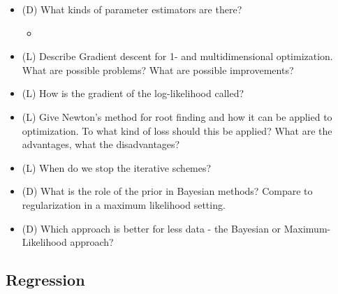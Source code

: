 \begin{itemize}
    \item (D) What kinds of parameter estimators are there?
    \begin{itemize}
        \item {}
    \end{itemize}
    \answerboxM
    \item (L) Describe Gradient descent for 1- and multidimensional optimization. What are possible problems? What are possible improvements?
    \answerboxL
    \item (L) How is the gradient of the log-likelihood called?
    \answerboxS
    \item (L) Give Newton's method for root finding and how it can be applied to optimization. To what kind of loss should this be applied? What are the advantages, what the disadvantages?
    \answerboxL
    \item (L) When do we stop the iterative schemes?
    \answerboxS
    \item (D) What is the role of the prior in Bayesian methods? Compare to regularization in a maximum likelihood setting.
    \answerboxM
    \item (D) Which approach is better for less data - the Bayesian or Maximum-Likelihood approach?
    \answerboxS
\end{itemize}


\subsection*{Regression}

